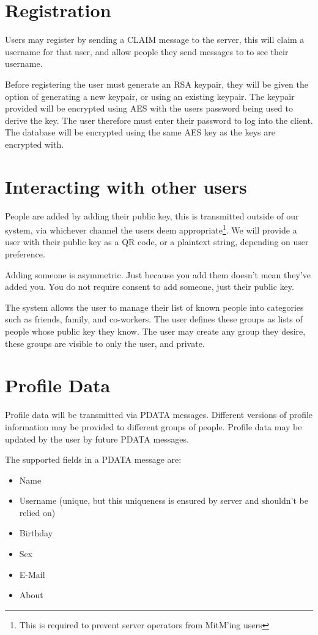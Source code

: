\section{Registration}
Users may register by sending a CLAIM message to the server, this will claim a
username for that user, and allow people they send messages to to see their
username.

Before registering the user must generate an RSA keypair, they will be given the
option of generating a new keypair, or using an existing keypair. The keypair
provided will be encrypted using AES with the users password being used to
derive the key. The user therefore must enter their password to log into the
client. The database will be encrypted using the same AES key as the keys are
encrypted with.

\section{Interacting with other users}
People are added by adding their public key, this is transmitted outside of our
system, via whichever channel the users deem appropriate\footnote{This is
required to prevent server operators from MitM'ing users}. We will provide a
user with their public key as a QR code, or a plaintext string, depending on
user preference.

Adding someone is asymmetric. Just because you add them doesn't mean they've
added you. You do not require consent to add someone, just their public key.
    
The system allows the user to manage their list of known people into categories
such as friends, family, and co-workers. The user defines these groups as lists
of people whose public key they know. The user may create any group they desire,
these groups are visible to only the user, and private.

\section{Profile Data}
Profile data will be transmitted via PDATA messages. Different versions of
profile information may be provided to different groups of people. Profile data
may be updated by the user by future PDATA messages.

The supported fields in a PDATA message are:
    \begin{itemize}
        \item Name
        \item Username (unique, but this uniqueness is ensured by server and
              shouldn't be relied on)
        \item Birthday
        \item Sex
        \item E-Mail
        \item About
    \end{itemize}

